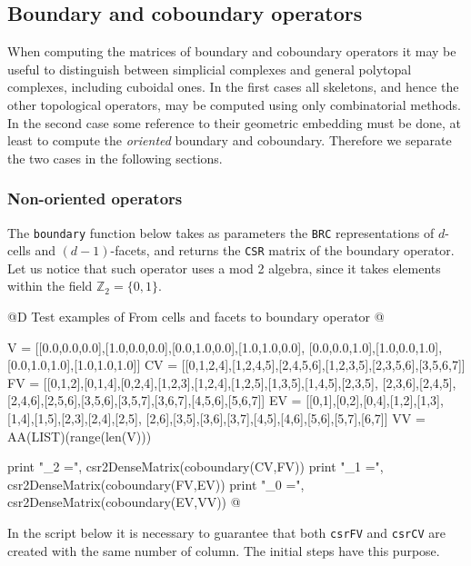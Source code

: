 \documentclass[11pt,oneside]{article}	%
\def\Z{\mathbb{Z}}
\begin{document}
\subsection{Boundary and coboundary operators}

When computing the matrices of boundary and coboundary operators it may be useful to distinguish between simplicial complexes and general polytopal complexes, including  cuboidal ones. In the first cases all skeletons, and hence the other topological operators, may be computed using only combinatorial methods. In the second case some reference to their geometric embedding must be done, at least to compute the \emph{oriented} boundary and coboundary. Therefore we separate the two cases in the following sections.


\subsubsection{Non-oriented operators}

The \texttt{boundary} function below takes as parameters the \texttt{BRC} representations of $d$-cells and $(d-1)$-facets, and returns the \texttt{CSR} matrix of the boundary operator. Let us notice that such operator uses a mod 2 algebra, since it takes elements within the field $\Z_2=\{0,1\}$.

@D Test examples of From cells and facets to boundary operator
@{V = [[0.0,0.0,0.0],[1.0,0.0,0.0],[0.0,1.0,0.0],[1.0,1.0,0.0],
	   [0.0,0.0,1.0],[1.0,0.0,1.0],[0.0,1.0,1.0],[1.0,1.0,1.0]]
CV = [[0,1,2,4],[1,2,4,5],[2,4,5,6],[1,2,3,5],[2,3,5,6],[3,5,6,7]]
FV = [[0,1,2],[0,1,4],[0,2,4],[1,2,3],[1,2,4],[1,2,5],[1,3,5],[1,4,5],[2,3,5],
	  [2,3,6],[2,4,5],[2,4,6],[2,5,6],[3,5,6],[3,5,7],[3,6,7],[4,5,6],[5,6,7]]
EV = [[0,1],[0,2],[0,4],[1,2],[1,3],[1,4],[1,5],[2,3],[2,4],[2,5],
	  [2,6],[3,5],[3,6],[3,7],[4,5],[4,6],[5,6],[5,7],[6,7]]
VV = AA(LIST)(range(len(V)))

print "\ncoboundary_2 =\n", csr2DenseMatrix(coboundary(CV,FV))
print "\ncoboundary_1 =\n", csr2DenseMatrix(coboundary(FV,EV))
print "\ncoboundary_0 =\n", csr2DenseMatrix(coboundary(EV,VV))
@}

In the script below it is necessary to guarantee that both \texttt{csrFV} and \texttt{csrCV} are created with the same number of column. The initial steps have this purpose.
\end{document}
